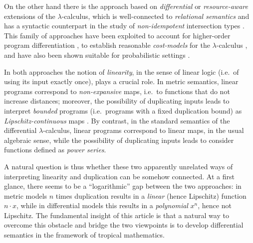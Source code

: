 On the other hand there is the approach based on \emph{differential} \cite{difflambda} or \emph{resource-aware} \cite{Boudol1993} extensions of the $\lambda$-calculus, which is well-connected to \emph{relational semantics} \cite{Manzo2012, Manzo2013, dill} and has a syntactic counterpart in the study of \emph{non-idempotent} intersection types \cite{decarvalho2018, Mazza2016}. This family of approaches have been exploited to account for higher-order program differentiation \cite{difflambda}, to establish reasonable \emph{cost-models} for the $\lambda$-calculus \cite{Accattoli2021}, and have also been shown suitable for probabilistic settings \cite{Manzo2013, Breuvart2018, PistoneLICS2022}. 


In both approaches the notion of \emph{linearity}, in the sense of linear logic \cite{girardLl} (i.e.~of using its input exactly once), plays a crucial role.
In metric semantics, linear programs correspond to \emph{non-expansive} maps, i.e.~to functions that do not increase distances; moreover, the possibility of duplicating inputs leads to interpret \emph{bounded} programs (i.e.~programs with a fixed duplication bound) as \emph{Lipschitz-continuous} maps \cite{Gaboardi2017}.
By contrast, in the standard semantics of the differential $\lambda$-calculus, linear programs correspond to linear maps, in the usual algebraic sense, while the possibility of duplicating inputs leads to consider functions defined as \emph{power series}.


A natural question is thus whether these two apparently unrelated ways of interpreting linearity and duplication can be somehow connected. At a first glance, there seems to be a  ``logarithmic'' gap between the two approaches:
in metric models $n$ times duplication results in a \emph{linear} (hence Lipschitz) function $n\cdot x$, while in differential models this results in a \emph{polynomial} $x^{n}$, hence not Lipschitz. The fundamental insight of this article is that a natural way to overcome 
this obstacle and bridge the two viewpoints 
is to develop differential semantics in the framework of 
tropical mathematics.
%
%
%



